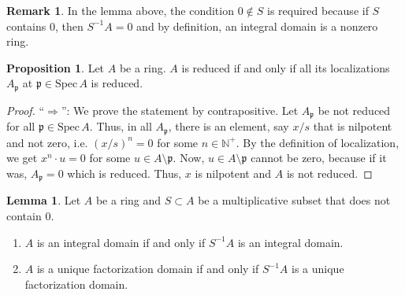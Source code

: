 \documentclass[a4paper]{book}
\theoremstyle{definition}
\newtheorem{lemma}[definition]{Lemma}
\newtheorem{proposition}[definition]{Proposition}
\newtheorem*{remark}{Remark}
\begin{document}
\begin{rembox}
    \begin{remark}
        In the lemma above, the condition \(0 \not\in S\) is required because if \(S\) contains \(0\), then \(S^{-1}A = 0\) and by definition, an integral domain is a nonzero ring.
    \end{remark}
\end{rembox}


\begin{thmbox}
    \begin{proposition}
        Let \(A\) be a ring. \(A\) is reduced if and only if all its localizations \(A_\mathfrak{p}\) at \(\mathfrak{p} \in \mathrm{Spec} \, A\) is reduced.
    \end{proposition}
\end{thmbox}

\begin{proof}
    ``\(\Rightarrow\)'': We prove the statement by contrapositive. Let \(A_\mathfrak{p}\) be not reduced for all \(\mathfrak{p} \in \mathrm{Spec} \, A\). Thus, in all \(A_\mathfrak{p}\), there is an element, say \(x / s\) that is nilpotent and not zero, i.e. \((x / s)^n = 0\) for some \(n \in \mathbb{N}^+\). By the definition of localization, we get \(x^n \cdot u = 0\) for some \(u \in A \setminus \mathfrak{p}\). Now, \(u \in A \setminus \mathfrak{p}\) cannot be zero, because if it was, \(A_\mathfrak{p} = 0\) which is reduced. Thus, \(x\) is nilpotent and \(A\) is not reduced.
\end{proof}








\begin{thmbox}
    \begin{lemma}
        Let \(A\) be a ring and \(S \subset A\) be a multiplicative subset that does not contain \(0\).
        
        \begin{enumerate}
            \item \(A\) is an integral domain if and only if \(S^{-1}A\) is an integral domain.
            \item \(A\) is a unique factorization domain if and only if \(S^{-1}A\) is a unique factorization domain.
        \end{enumerate}
    \end{lemma}
\end{thmbox}
\end{document}
